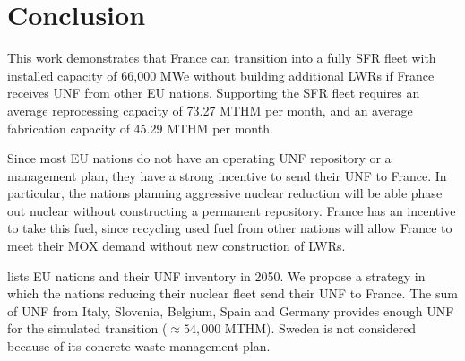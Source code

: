 \section{Conclusion}

This work demonstrates that France can transition into
a fully \gls{SFR} fleet with installed capacity of 66,000 \gls{MWe} without
building additional \glspl{LWR}
if France receives \gls{UNF} from other \gls{EU} nations.
Supporting the \gls{SFR} fleet requires an average 
reprocessing capacity of 73.27 \gls{MTHM} per month,
and an average fabrication capacity of 45.29 \gls{MTHM} per month.


Since most \gls{EU} nations do not have an operating \gls{UNF}
repository or a management plan, they have a strong incentive
to send their \gls{UNF} to France. In particular, the nations
planning aggressive nuclear reduction will be able phase out nuclear
without constructing a permanent repository. France has an
incentive to take this fuel, since recycling used fuel from
other nations will allow France to meet their MOX demand
without new construction of \glspl{LWR}.

 lists \gls{EU} nations and their \gls{UNF} inventory
in 2050. We propose a strategy in which 
the nations reducing their nuclear fleet send their \gls{UNF} to France.
The sum of \gls{UNF} from Italy, Slovenia, Belgium, Spain and Germany
provides enough \gls{UNF} for the simulated transition ($\approx 54,000$ MTHM). Sweden is not considered because of its concrete waste management plan.



